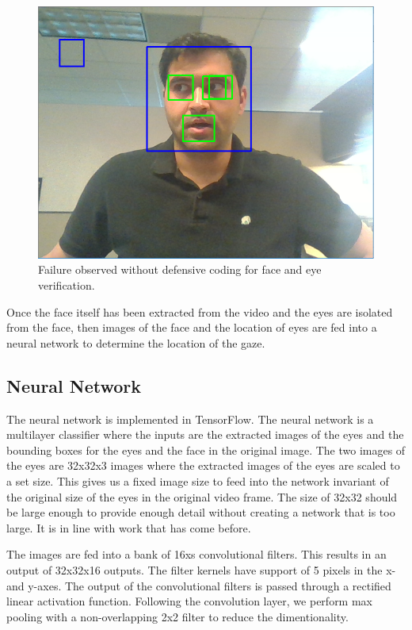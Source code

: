 \documentclass[10pt,twocolumn,letterpaper]{article}
\begin{document}
\begin{figure}
  \begin{center}
    \includegraphics[width=\linewidth]{defensive_coding_example}
  \end{center}
  \caption{Failure observed without defensive coding for face and eye
    verification.}
  \label{fig:defensive}
\end{figure}


Once the face itself has been extracted from the video and the eyes
are isolated from the face, then images  of the face and the location
of eyes are fed into a neural network to determine the location of the
gaze.


\subsection{Neural Network}
The neural network is implemented in TensorFlow. The neural network is
a multilayer classifier where the inputs are the extracted images of
the eyes and the bounding boxes for the eyes and the face in the
original image. The two images of the eyes are 32x32x3 images where
the extracted images of the eyes are scaled to a set size. This gives
us a fixed image size to feed into the network invariant of the
original size of the eyes in the original video frame. The size of
32x32 should be large enough to provide enough detail without creating
a network that is too large. It is in line with work that has come
before.

The images are fed into a bank of 16xs convolutional
filters. This results in an output of 32x32x16 outputs. The filter
kernels have support of 5 pixels in the x- and y-axes. The output of
the convolutional filters is passed through a rectified linear
activation function. Following the convolution layer, we perform max pooling with a
non-overlapping 2x2 filter to reduce the dimentionality.
\end{document}
